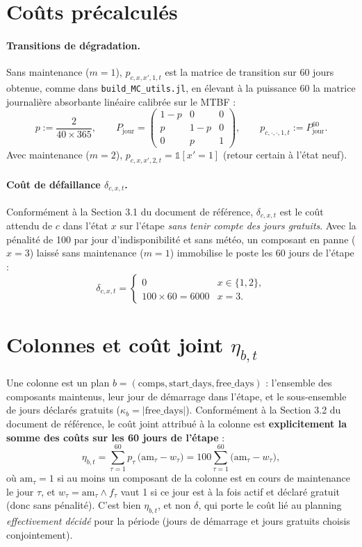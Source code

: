 \documentclass[11pt]{article}
\begin{document}
\section{Coûts précalculés}

\paragraph{Transitions de dégradation.} Sans maintenance ($m=1$), $p_{c,x,x',1,t}$ est la matrice de
transition sur 60 jours obtenue, comme dans \texttt{build\_MC\_utils.jl}, en élevant à la puissance 60 la
matrice journalière absorbante linéaire calibrée sur le MTBF :
$$ p := \frac{2}{40\times365}, \qquad P_{\text{jour}} = \begin{pmatrix} 1-p & 0 & 0 \\ p & 1-p & 0 \\ 0 &
p & 1 \end{pmatrix}, \qquad p_{c,\cdot,\cdot,1,t} := P_{\text{jour}}^{60}. $$
Avec maintenance ($m=2$), $p_{c,x,x',2,t} = \mathbb{1}[x'=1]$ (retour certain à l'état neuf).

\paragraph{Coût de défaillance $\delta_{c,x,t}$.} Conformément à la Section 3.1 du document de référence,
$\delta_{c,x,t}$ est le coût attendu de $c$ dans l'état $x$ sur l'étape \emph{sans tenir compte des jours
gratuits}. Avec la pénalité de 100 par jour d'indisponibilité et sans météo, un composant en panne
($x=3$) laissé sans maintenance ($m=1$) immobilise le poste les 60 jours de l'étape :
$$ \delta_{c,x,t} = \begin{cases} 0 & x \in \{1,2\}, \\ 100 \times 60 = 6000 & x = 3. \end{cases} $$

\section{Colonnes et coût joint $\eta_{b,t}$}

Une colonne est un plan $b = (\text{comps}, \text{start\_days}, \text{free\_days})$ : l'ensemble des
composants maintenus, leur jour de démarrage dans l'étape, et le sous-ensemble de jours déclarés gratuits
($\kappa_b = |\text{free\_days}|$). Conformément à la Section 3.2 du document de référence, le coût joint
attribué à la colonne est \textbf{explicitement la somme des coûts sur les 60 jours de l'étape} :
$$ \eta_{b,t} = \sum_{\tau=1}^{60} p_\tau\,\big(\mathrm{am}_\tau - w_\tau\big) = 100\sum_{\tau=1}^{60}
\big(\mathrm{am}_\tau - w_\tau\big), $$
où $\mathrm{am}_\tau=1$ si au moins un composant de la colonne est en cours de maintenance le jour $\tau$,
et $w_\tau = \mathrm{am}_\tau \wedge f_\tau$ vaut 1 si ce jour est à la fois actif et déclaré gratuit (donc
sans pénalité). C'est bien $\eta_{b,t}$, et non $\delta$, qui porte le coût lié au planning
\emph{effectivement décidé} pour la période (jours de démarrage et jours gratuits choisis conjointement).
\end{document}

